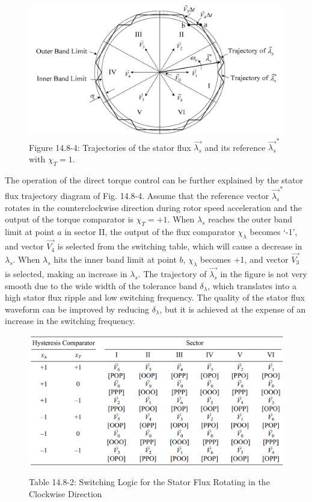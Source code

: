 \documentclass[letterpaper,12pt]{article}
\begin{document}
\begin{figure}[h]
\centering
\includegraphics{graficos/img26.jpg}
\caption{Figure 14.8-4: Trajectories of the stator flux $\vec{\lambda_s}$ and its reference $\vec{\lambda_s}^*$ with $\chi_T = 1$.}
\label{fig:14.8-4}
\end{figure}
\FloatBarrier

The operation of the direct torque control can be further explained by the stator flux trajectory diagram of Fig. 14.8-4. Assume that the reference vector $\vec{\lambda_s}^*$ rotates in the counterclockwise direction during rotor speed acceleration and the output of the torque comparator is $\chi_T = +1$. When $\lambda_s$ reaches the outer band limit at point $a$ in sector II, the output of the flux comparator $\chi_\lambda$ becomes ‘-1’, and vector $\vec{V_4}$ is selected from the switching table, which will cause a decrease in $\lambda_s$. When $\lambda_s$ hits the inner band limit at point $b$, $\chi_\lambda$ becomes +1, and vector $\vec{V_3}$ is selected, making an increase in $\lambda_s$. The trajectory of $\vec{\lambda_s}$ in the figure is not very smooth due to the wide width of the tolerance band $\delta_\lambda$, which translates into a high stator flux ripple and low switching frequency. The quality of the stator flux waveform can be improved by reducing $\delta_\lambda$, but it is achieved at the expense of an increase in the switching frequency.

\begin{figure}[h]
\centering
\caption{Table 14.8-2: Switching Logic for the Stator Flux Rotating in the Clockwise Direction}
\includegraphics[scale=0.4]{graficos/tabla_14_8_2.png}
\label{tab:14.8-2}
\end{figure}
\FloatBarrier
\end{document}
